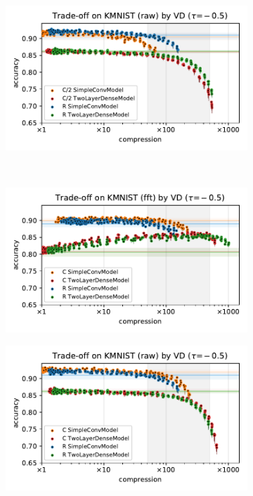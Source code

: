 \documentclass[a4paper,10pt,onecolumn]{article}
\begin{document}
\begin{figure}[b]
\begin{subfigure}[b]{0.5\columnwidth}
  \end{subfigure}%
  \begin{subfigure}[b]{0.5\columnwidth}
    \centering
    \includegraphics[width=\columnwidth]{figure__mnist-like__trade-off/appendix__cmp__VD__kmnist__raw__-0.5.pdf}
  \end{subfigure} \\ %
  \begin{subfigure}[b]{0.5\columnwidth}
    \centering
    \includegraphics[width=\columnwidth]{figure__mnist-like__trade-off/appendix__VD__kmnist__fft__-0.5.pdf}
  \end{subfigure}%
  \begin{subfigure}[b]{0.5\columnwidth}
    \centering
    \includegraphics[width=\columnwidth]{figure__mnist-like__trade-off/appendix__VD__kmnist__raw__-0.5.pdf}

\end{subfigure}
\end{figure}
\end{document}
